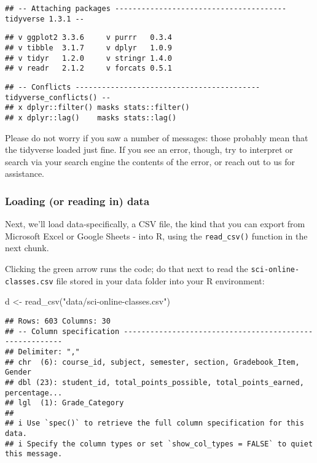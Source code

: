 \documentclass[
]{article}
\newenvironment{Shaded}{\begin{snugshade}}{\end{snugshade}}
\newcommand{\FunctionTok}[1]{\textcolor[rgb]{0.00,0.00,0.00}{#1}}
\newcommand{\NormalTok}[1]{#1}
\newcommand{\OtherTok}[1]{\textcolor[rgb]{0.56,0.35,0.01}{#1}}
\newcommand{\StringTok}[1]{\textcolor[rgb]{0.31,0.60,0.02}{#1}}
\begin{document}
\begin{verbatim}
## -- Attaching packages --------------------------------------- tidyverse 1.3.1 --
\end{verbatim}

\begin{verbatim}
## v ggplot2 3.3.6     v purrr   0.3.4
## v tibble  3.1.7     v dplyr   1.0.9
## v tidyr   1.2.0     v stringr 1.4.0
## v readr   2.1.2     v forcats 0.5.1
\end{verbatim}

\begin{verbatim}
## -- Conflicts ------------------------------------------ tidyverse_conflicts() --
## x dplyr::filter() masks stats::filter()
## x dplyr::lag()    masks stats::lag()
\end{verbatim}

Please do not worry if you saw a number of messages: those probably mean
that the tidyverse loaded just fine. If you see an error, though, try to
interpret or search via your search engine the contents of the error, or
reach out to us for assistance.

\hypertarget{loading-or-reading-in-data}{%
\subsubsection{Loading (or reading in)
data}\label{loading-or-reading-in-data}}

Next, we'll load data-specifically, a CSV file, the kind that you can
export from Microsoft Excel or Google Sheets - into R, using the
\texttt{read\_csv()} function in the next chunk.

Clicking the green arrow runs the code; do that next to read the
\texttt{sci-online-classes.csv} file stored in your data folder into
your R environment:

\begin{Shaded}
\begin{Highlighting}[]
\NormalTok{d }\OtherTok{\textless{}{-}} \FunctionTok{read\_csv}\NormalTok{(}\StringTok{"data/sci{-}online{-}classes.csv"}\NormalTok{)}
\end{Highlighting}
\end{Shaded}

\begin{verbatim}
## Rows: 603 Columns: 30
## -- Column specification --------------------------------------------------------
## Delimiter: ","
## chr  (6): course_id, subject, semester, section, Gradebook_Item, Gender
## dbl (23): student_id, total_points_possible, total_points_earned, percentage...
## lgl  (1): Grade_Category
## 
## i Use `spec()` to retrieve the full column specification for this data.
## i Specify the column types or set `show_col_types = FALSE` to quiet this message.
\end{verbatim}
\end{document}

